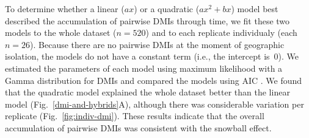 \begin{doublespace}
To determine whether a linear ($ax$) or a quadratic ($ax^{2} + bx$) model
best described the accumulation of pairwise DMIs through time,
we fit these two models to the whole dataset ($n = 520$)
and to each replicate individualy (each $n = 26$).
%
Because there are no pairwise DMIs at the moment of geographic isolation,
the models do not have a constant term (i.e., the intercept is~0).
%
We estimated the parameters of each model using maximum likelihood
with a Gamma distribution for DMIs and compared the models using AIC
\citep{bol08}.
%
We found that the quadratic model explained the whole dataset better
than the linear model (Fig.~\ref{dmi-and-hybrids}A),
although there was considerable variation per replicate
(Fig.~\ref{fig:indiv-dmi}).
%
These results indicate that the overall accumulation of pairwise DMIs
was consistent with the snowball effect.




\end{doublespace}
